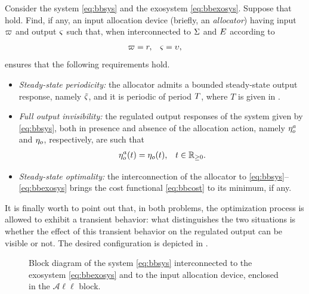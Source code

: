 \begin{problem}
  \label{prb:fullinv}
  Consider the system \eqref{eq:bbsys} and the exosystem \eqref{eq:bbexosys}. Suppose that  hold.
  Find, if any, an input allocation device (briefly, an \emph{allocator}) having input $\varpi$ and output $\varsigma$ such that, when interconnected to $\Sigma$ and $E$ according to
  \begin{subequations}
	  \begin{align}
	  	\varpi = r, & & \varsigma = \upsilon,
	  \end{align}
  \end{subequations}
  ensures that the following requirements hold.
  \begin{itemize}
		\item[\emph{(P)}] \emph{Steady-state periodicity:} the allocator admits a bounded steady-state output response, namely $\tilde{\varsigma}$, and it is periodic of period $T$, where $T$ is given in .
		\item[\emph{(I)}] \emph{Full output invisibility:} the regulated output responses of the system given by \eqref{eq:bbsys}, both in presence and absence of the allocation action, namely $\eta_o^a$ and $\eta_o$, respectively, are such that
		  \begin{align}
		    \label{eq:fullinv}
		    \eta_o^a(t) &= \eta_o(t), & t\in\mathbb{R}_{\geq 0}.
		  \end{align}
      \item[\emph{(O)}] \emph{Steady-state optimality:} the interconnection of the allocator to \eqref{eq:bbsys}--\eqref{eq:bbexosys} brings the cost functional \eqref{eq:bbcost} to its minimum, if any.
  \end{itemize}
  \closestatement
\end{problem}

It is finally worth to point out that, in both problems, the optimization process is allowed to exhibit a transient behavior: what distinguishes the two situations is whether the effect of this transient behavior on the regulated output can be visible or not. The desired configuration is depicted in .
\begin{figure}[!t]
  \centering
  
  \caption{Block diagram of the system \eqref{eq:bbsys} interconnected to the exosystem \eqref{eq:bbexosys} and to the input allocation device, enclosed in the $\mathcal{A}\ell\ell$ block.}
  \label{fig:allbbsys}
\end{figure}
